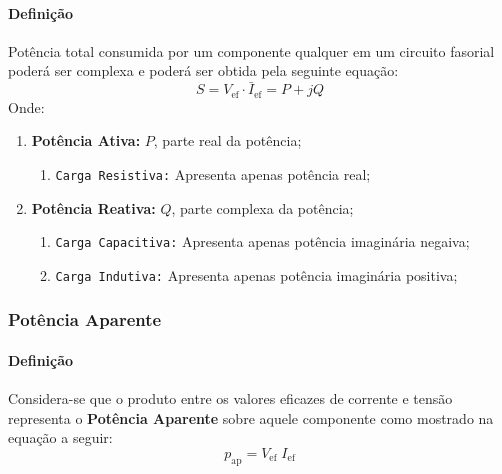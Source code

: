 \documentclass{article}
\begin{document}
                \paragraph{Definição}Potência total consumida por um componente qualquer em um circuito fasorial poderá ser complexa e poderá ser obtida pela seguinte equação:
                    \begin{equation}
                        \boxed{
                            S = V_{\text{ef}} \cdot \bar{I}_{\text{ef}} = P + jQ
                        }
                    \end{equation}
                Onde:
                    \begin{enumerate}
                        \item \textbf{Potência Ativa:} $P$, parte real da potência;
                            \begin{enumerate}[noitemsep]
                                \item \texttt{Carga Resistiva:} Apresenta apenas potência real;
                            \end{enumerate}

                        \item \textbf{Potência Reativa:} $Q$, parte complexa da potência;
                            \begin{enumerate}[noitemsep]
                                \item \texttt{Carga Capacitiva:} Apresenta apenas potência imaginária negaiva;
                                \item \texttt{Carga Indutiva:} Apresenta apenas potência imaginária positiva;
                            \end{enumerate}
                    \end{enumerate}

            \subsubsection{Potência Aparente}
                \paragraph{Definição}Considera-se que o produto entre os valores eficazes de corrente e tensão representa o \textbf{Potência Aparente} sobre aquele componente como mostrado na equação a seguir:
                    \begin{equation}
                        \boxed{p_{\text{ap}} = V_{\text{ef}}\;I_{\text{ef}}}
                    \end{equation}
\end{document}
